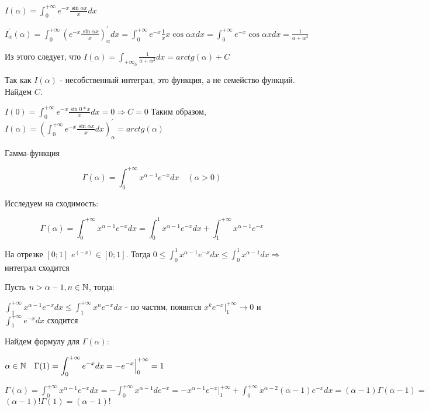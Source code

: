 \documentclass[12pt]{article}
\begin{document}
    \Ex $\displaystyle I(\alpha) = \int^{+\infty}_0 e^{-x} \frac{\sin\alpha x}{x}dx$

    $\displaystyle I^\prime_\alpha(\alpha) = \int^{+\infty}_0 \left(e^{-x} \frac{\sin\alpha x}{x}\right)^\prime_\alpha dx = \int^{+\infty}_0 e^{-x} \frac{1}{x} x \cos\alpha x dx =
    \int^{+\infty}_0 e^{-x} \cos\alpha x dx = \frac{1}{a + \alpha^2}$

    Из этого следует, что $\displaystyle I(\alpha) = \int_{+\infty}_{0} \frac{1}{a + \alpha^2} dx = arctg(\alpha) + C$

    Так как $I(\alpha)$ - несобственный интеграл, это функция, а не семейство функций. Найдем $C$.

    $\displaystyle I(0) = \int^{+\infty}_0 e^{-x} \frac{\sin 0 * x}{x}dx = 0 \Longrightarrow C = 0$
    Таким образом, $\displaystyle I(\alpha) = \left(\int^{+\infty}_0 e^{-x} \frac{\sin\alpha x}{x} dx\right)^\prime_\alpha = arctg(\alpha)$

    \Ex Гамма-функция

    \[\Gamma(\alpha) = \int^{+\infty}_0 x^{\alpha - 1} e^{-x} dx \quad (\alpha > 0)\]

    Исследуем на сходимость:

    \[\Gamma(\alpha) = \int^{+\infty}_0 x^{\alpha - 1} e^{-x} dx = \int^{1}_0 x^{\alpha - 1} e^{-x} dx + \int^{+\infty}_1 x^{\alpha - 1} e^{-x}\]

    На отрезке $[0; 1]$ $e^(-x) \in [0;1]$.
    Тогда $\displaystyle 0 \leq \int^{1}_0 x^{\alpha - 1} e^{-x} dx \leq \int^{1}_0 x^{\alpha - 1} dx \Longrightarrow$ интеграл сходится

    Пусть $n > \alpha - 1, n \in \mathbb{N}$, тогда:

    $\displaystyle \int^{+\infty}_1 x^{\alpha - 1} e^{-x} dx \leq \int^{+\infty}_1 x^{n} e^{-x} dx$ - по частям, появятся $\displaystyle x^{k} e^{-x} \Big|^{+\infty}_1 \rightarrow 0$ и $\displaystyle \int^{+\infty}_1 e^{-x} dx$ сходится

    Найдем формулу для $\Gamma(\alpha)$:

    $\displaystyle \alpha \in \mathbb{N} \quad \Gamma(1) = \int^{+\infty}_0 e^{-x} dx = -e^{-x} \Big|^{+\infty}_{0} = 1$

    $\displaystyle \Gamma(\alpha) = \int^{+\infty}_0 x^{\alpha - 1} e^{-x} dx = -\int^{+\infty}_0 x^{\alpha - 1} de^{-x} = -x^{\alpha - 1}e^{-x} \Big|^{+\infty}_1 + \int^{+\infty}_0 x^{\alpha - 2} (\alpha - 1) e^{-x} dx = (\alpha - 1) \Gamma(\alpha - 1) = $
    $(\alpha - 1)! \Gamma(1) = (\alpha - 1)!$
\end{document}
